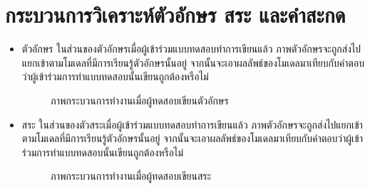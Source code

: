 \documentclass[12pt,oneside,openright,a4paper]{cpe-thai-project}
\begin{document}
\section{กระบวนการวิเคราะห์ตัวอักษร สระ และคำสะกด}
\begin{itemize}
  \item ตัวอักษร
        ในส่วนของตัวอักษรเมื่อผู้เข้าร่วมแบบทดสอบทำการเขียนแล้ว ภาพตัวอักษรจะถูกส่งไปแยกเข้าตามโมเดลที่มีการเรียนรู้ตัวอักษรนั้นอยู่ จากนั้นจะเอาผลลัพธ์ของโมเดลมาเทียบกับคำตอบว่าผู้เข้าร่วมการทำแบบทดสอบนั้นเขียนถูกต้องหรือไม่
        \begin{figure}[!h]\centering
          \setlength{\fboxrule}{0.2mm} %
          \setlength{\fboxsep}{1cm}
          \caption{ภาพกระบวนการทำงานเมื่อผู้ทดสอบเขียนตัวอักษร}\label{fig:system}                  
         \end{figure}
        \item สระ
        ในส่วนของตัวสระเมื่อผู้เข้าร่วมแบบทดสอบทำการเขียนแล้ว ภาพตัวอักษรจะถูกส่งไปแยกเข้าตามโมเดลที่มีการเรียนรู้ตัวอักษรนั้นอยู่ จากนั้นจะเอาผลลัพธ์ของโมเดลมาเทียบกับคำตอบว่าผู้เข้าร่วมการทำแบบทดสอบนั้นเขียนถูกต้องหรือไม่
        \begin{figure}[!h]\centering
          \setlength{\fboxrule}{0.2mm} %
          \setlength{\fboxsep}{1cm}
          \caption{ภาพกระบวนการทำงานเมื่อผู้ทดสอบเขียนสระ}\label{fig:system}                  

\end{figure}
\end{itemize}
\end{document}
